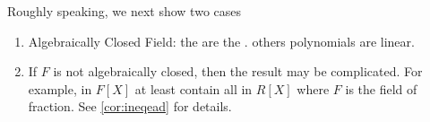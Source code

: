 \documentclass{article}
\begin{document}
 Roughly speaking, we next show two cases
\begin{enumerate}
    \item Algebraically Closed Field: the   are the .  others polynomials are linear.
    \item If $F$ is not algebraically closed, then the result may be complicated. For example,  in $F[X]$ at least contain all  in $R[X]$ where $F$ is the field of fraction. See \cref{cor:ineqead} for details.
\end{enumerate}
\end{document}
